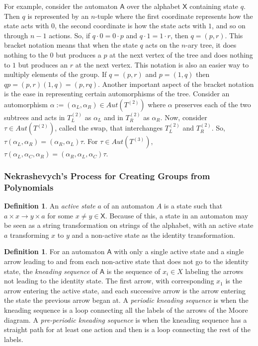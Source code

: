 \documentclass[11pt]{amsart}
\theoremstyle{definition}
\newtheorem{definition}[theorem]{Definition}
\theoremstyle{remark}
\numberwithin{equation}{section}
\begin{document}
\indent For example, consider the automaton $\textsf{A}$ over the alphabet $\textsf{X}$ containing state $q$. Then $q$ is represented by an $n$-tuple where the first coordinate represents how the state acts with $0$, the second coordinate is how the state acts with $1$, and so on through $n - 1$ actions. So, if $q \cdot 0 = 0 \cdot p$ and $q \cdot 1 = 1 \cdot r$, then $q = (p,r)$. This bracket notation means that when the state $q$ acts on the $n$-ary tree, it does nothing to the $0$ but produces a $p$ at the next vertex of the tree and does nothing to $1$ but produces an $r$ at the next vertex. This notation is also an easier way to multiply elements of the group. If $q = (p,r)$ and $p = (1,q)$ then $qp = (p,r)(1,q) = (p,rq)$. Another important aspect of the bracket notation is the ease in representing certain automorphisms of the tree. Consider an automorphism $\alpha := (\alpha_L, \alpha_R) \in Aut(T^{(2)})$ where $\alpha$ preserves each of the two subtrees and acts in $T_{L}^{(2)}$ as $\alpha_L$ and in $T_{R}^{(2)}$ as $\alpha_R$. Now, consider $\tau \in Aut(T^{(2)})$, called the swap, that interchanges $T_{L}^{(2)}$ and $T_{R}^{(2)}$. So, $\tau (\alpha_L,\alpha_R) = (\alpha_R,\alpha_L) \tau$. For $\tau \in Aut(T^{(3)})$, $\tau(\alpha_L,\alpha_C,\alpha_R) = (\alpha_R,\alpha_L,\alpha_C)\tau$.\\

\subsubsection{Nekrashevych's Process for Creating Groups from Polynomials}

\begin{definition}
An \textit{active state} $a$ of an automaton $A$ is a state such that $a\times x\to y\times a$ for some $x\neq y\in \textsf{X}$. Because of this, a state in an automaton may be seen as a string transformation on strings of the alphabet, with an active state $a$ transforming $x$ to $y$ and a non-active state as the identity transformation.
\end{definition}

\begin{definition}
For an automaton $\textsf{A}$ with only a single active state and a single arrow leading to and from each non-active state that does not go to the identity state, the \textit{kneading sequence} of $\textsf{A}$ is the sequence of $x_i\in X$ labeling the arrows not leading to the identity state. The first arrow, with corresponding $x_1$ is the arrow entering the active state, and each successive arrow is the arrow entering the state the previous arrow began at. A \textit{periodic kneading sequence} is when the kneading sequence is a loop connecting all the labels of the arrows of the Moore diagram. A \textit{pre-periodic kneading sequence} is when the kneading sequence has a straight path for at least one action and then is a loop connecting the rest of the labels.
\end{definition}
\end{document}
